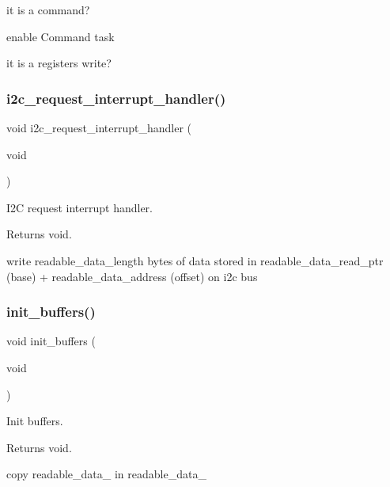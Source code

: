 it is a command?

enable Command task

it is a registers write? \mbox{\label{i2c-th_8ino_ac816bd8aafe77e7a571574c8a26eead5}} 
\subsubsection{\texorpdfstring{i2c\+\_\+request\+\_\+interrupt\+\_\+handler()}{i2c\_request\_interrupt\_handler()}}
{\footnotesize\ttfamily void i2c\+\_\+request\+\_\+interrupt\+\_\+handler (\begin{DoxyParamCaption}\item[{void}]{ }\end{DoxyParamCaption})}



I2C request interrupt handler. 

\begin{DoxyReturn}{Returns}
void. 
\end{DoxyReturn}
write readable\+\_\+data\+\_\+length bytes of data stored in readable\+\_\+data\+\_\+read\+\_\+ptr (base) + readable\+\_\+data\+\_\+address (offset) on i2c bus \mbox{\label{i2c-th_8ino_ad241cc00b1a92e6d85827df96778e442}} 
\subsubsection{\texorpdfstring{init\+\_\+buffers()}{init\_buffers()}}
{\footnotesize\ttfamily void init\+\_\+buffers (\begin{DoxyParamCaption}\item[{void}]{ }\end{DoxyParamCaption})}



Init buffers. 

\begin{DoxyReturn}{Returns}
void. 
\end{DoxyReturn}
copy readable\+\_\+data\+\_ in readable\+\_\+data\+\_ \mbox{\label{i2c-th_8ino_ad8b80a0c08f928106018edd6ea435b95}} 

